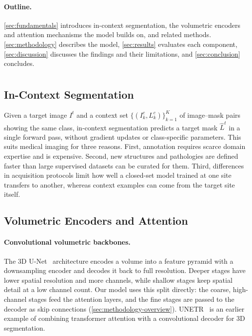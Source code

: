 \documentclass[hidelinks, a4paper, 12pt, ngerman, english]{article}  %
\begin{document}
\paragraph{Outline.}
\autoref{sec:fundamentals} introduces in-context segmentation, the volumetric
encoders and attention mechanisms the model builds on, and related methods.
\autoref{sec:methodology} describes the model, \autoref{sec:results} evaluates
each component, \autoref{sec:discussion} discusses the findings and their
limitations, and \autoref{sec:conclusion} concludes.%
\section{}\label{sec:fundamentals}

\subsection{In-Context Segmentation}\label{sec:fundamentals-icl}

Given a target image $I^t$ and a context set
$\{(I^c_k, L^c_k)\}_{k=1}^{K}$ of image--mask pairs showing the same class,
in-context segmentation predicts a target mask $\hat{L}^t$ in a single forward
pass, without gradient updates or class-specific parameters. This suits medical imaging for three reasons. First, annotation requires
scarce domain expertise and is expensive. Second, new structures and
pathologies are defined faster than large supervised datasets can be curated
for them. Third, differences in acquisition protocols limit how well a
closed-set model trained at one site transfers to another, whereas context
examples can come from the target site itself.%
\subsection{Volumetric Encoders and Attention}\label{sec:fundamentals-backbone}

\paragraph{Convolutional volumetric backbones.}
The 3D U-Net~\cite{cciccek20163d} architecture encodes a volume into a feature pyramid with a
downsampling encoder and decodes it back to full resolution. Deeper stages have lower spatial resolution and more channels, while shallow stages keep spatial detail at a low channel count. Our model uses this split directly: the coarse, high-channel stages feed the attention layers, and the fine stages are passed to the decoder as skip connections (\autoref{sec:methodology-overview}). UNETR~\cite{hatamizadeh2022unetr} is an earlier example of combining
transformer attention with a convolutional decoder for 3D segmentation.
\end{document}
